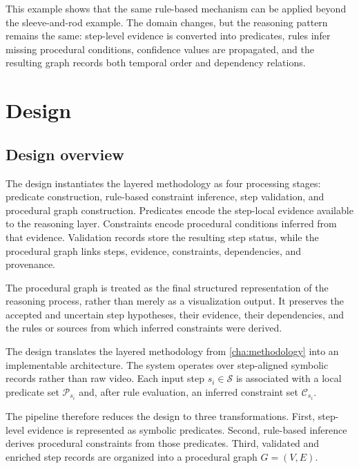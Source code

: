 This example shows that the same rule-based mechanism can be applied beyond the sleeve-and-rod example. The domain changes, but the reasoning pattern remains the same: step-level evidence is converted into predicates, rules infer missing procedural conditions, confidence values are propagated, and the resulting graph records both temporal order and dependency relations.






\chapter{Design}
\label{cha:design}

\section{Design overview}
\label{sec:design-overview}

The design instantiates the layered methodology as four processing stages: predicate construction, rule-based constraint inference, step validation, and procedural graph construction. Predicates encode the step-local evidence available to the reasoning layer. Constraints encode procedural conditions inferred from that evidence. Validation records store the resulting step status, while the procedural graph links steps, evidence, constraints, dependencies, and provenance.

The procedural graph is treated as the final structured representation of the reasoning process, rather than merely as a visualization output. It preserves the accepted and uncertain step hypotheses, their evidence, their dependencies, and the rules or sources from which inferred constraints were derived.

The design translates the layered methodology from \cref{cha:methodology} into an implementable architecture. The system operates over step-aligned symbolic records rather than raw video. Each input step $s_i \in \mathcal{S}$ is associated with a local predicate set $\mathcal{P}_{s_i}$ and, after rule evaluation, an inferred constraint set $\mathcal{C}_{s_i}$.

The pipeline therefore reduces the design to three transformations. First, step-level evidence is represented as symbolic predicates. Second, rule-based inference derives procedural constraints from those predicates. Third, validated and enriched step records are organized into a procedural graph $G=(V,E)$.

